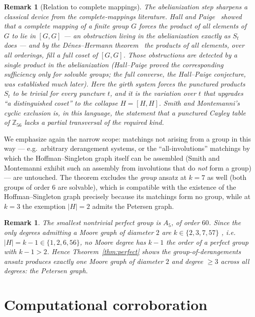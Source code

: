 \documentclass[10pt]{article}
\newtheorem{remark}[theorem]{Remark}
\begin{document}
\begin{remark}[Relation to complete mappings]
The abelianization step sharpens a classical device from the
complete-mappings literature. Hall and Paige~\cite{HP1955} showed that
a complete mapping of a finite group $G$ forces the product of all
elements of $G$ to lie in $[G,G]$ --- an obstruction living in the
abelianization exactly as $S_t$ does --- and by the Dénes--Hermann
theorem~\cite{DH1982} the products of all elements, over all orderings,
fill a full coset of $[G,G]$. Those obstructions are detected by a single product in the
abelianization (Hall--Paige proved the corresponding sufficiency only
for solvable groups; the full converse, the Hall--Paige conjecture, was
established much later). Here the girth system forces the
punctured products $S_t$ to be trivial for \emph{every} puncture $t$,
and it is the variation over $t$ that upgrades ``a distinguished
coset'' to the collapse $H=[H,H]$. Smith and Montemanni's cyclic
exclusion is, in this language, the statement that a punctured Cayley
table of $\mathbb{Z}_{56}$ lacks a partial transversal of the required
kind.
\end{remark}

We emphasize again the narrow scope: matchings not arising from a group
in this way --- e.g.\ arbitrary derangement systems, or the
``all-involutions'' matchings by which the Hoffman--Singleton graph
itself can be assembled (Smith and Montemanni exhibit such an assembly
from involutions that do \emph{not} form a group) --- are untouched.
The theorem excludes the \emph{group} ansatz at $k=7$ as well (both
groups of order $6$ are solvable), which is compatible with the
existence of the Hoffman--Singleton graph precisely because its
matchings form no group, while at $k=3$ the exemption $|H|=2$ admits
the Petersen graph.

\begin{remark}
The smallest nontrivial perfect group is $A_5$, of order $60$. Since the only
degrees admitting a Moore graph of diameter $2$ are $k\in\{2,3,7,57\}$
\cite{HS1960}, i.e.\ $|H|=k-1\in\{1,2,6,56\}$, no Moore degree has
$k-1$ the order of a perfect group with $k-1>2$. Hence
Theorem~\ref{thm:perfect} shows the group-of-derangements ansatz
produces exactly one Moore graph of diameter $2$ and degree $\geq 3$
across all degrees: the Petersen graph.
\end{remark}

\section{Computational corroboration}\label{sec:computation}
\end{document}

